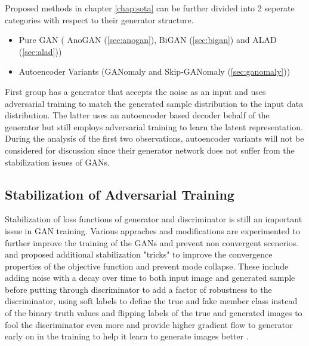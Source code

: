 Proposed methods in chapter \ref{chap:sota} can be further divided into 2 seperate categories with respect to their generator structure. 
\begin{itemize}
	\item Pure GAN ( AnoGAN (\ref{sec:anogan}), BiGAN (\ref{sec:bigan}) and ALAD (\ref{sec:alad}))
	\item Autoencoder Variants (GANomaly and Skip-GANomaly (\ref{sec:ganomaly}))
\end{itemize}

First group has a generator that accepts the noise as an input and uses adversarial training to match the generated sample distribution 
to the input data distribution. The latter uses an autoencoder based decoder behalf of the generator but still employs adversarial training
to learn the latent representation. During the analysis of the first two observations, autoencoder variants will not be considered for discussion 
since their generator network does not suffer from the stabilization issues of GANs.

\subsection{Stabilization of Adversarial Training}

Stabilization of loss functions of generator and discriminator is still an important issue in GAN training. Various appraches and modifications 
are experimented to further improve the training of the GANs and prevent non convergent scenerios.
\cite{methods} and \cite{fm} proposed additional stabilization "tricks" to improve the convergence properties of the objective function 
and prevent mode collapse. These include adding noise with a decay over time to both input image and generated 
sample before putting through discriminator to add a factor of robustness to the discriminator, using soft labels to define the true 
and fake member class instead of the binary truth values and flipping labels of the true and generated images to fool the discriminator even more
and provide higher gradient flow to generator early on in the training to help it learn to generate images better \cite{fm}.

